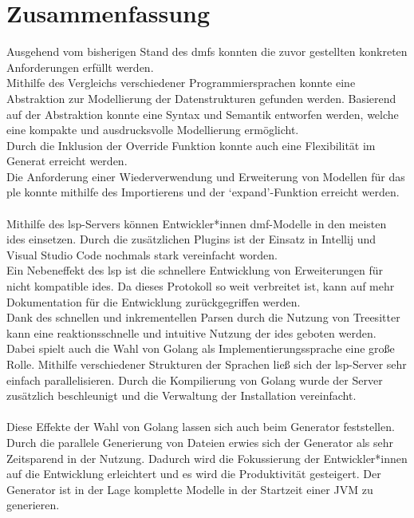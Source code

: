 \documentclass[./einleitung.tex]{subfiles}
\begin{document}
\section{Zusammenfassung}\label{sec:zusammenfassung}
Ausgehend vom bisherigen Stand des \acrshort{dmf}s konnten die zuvor gestellten konkreten Anforderungen erfüllt werden.\\
Mithilfe des Vergleichs verschiedener Programmiersprachen konnte eine Abstraktion zur Modellierung der Datenstrukturen gefunden werden.
Basierend auf der Abstraktion konnte eine Syntax und Semantik entworfen werden, welche eine kompakte und ausdrucksvolle Modellierung ermöglicht.\\
Durch die Inklusion der Override Funktion konnte auch eine Flexibilität im Generat erreicht werden.\\
Die Anforderung einer Wiederverwendung und Erweiterung von Modellen für das \acrshort{ple} konnte mithilfe des Importierens und der `expand'-Funktion erreicht werden.
\\\\
Mithilfe des \acrshort{lsp}-Servers können Entwickler*innen \acrshort{dmf}-Modelle in den meisten \acrshort{ide}s einsetzen.
Durch die zusätzlichen Plugins ist der Einsatz in Intellij und Visual Studio Code nochmals stark vereinfacht worden.\\
Ein Nebeneffekt des \acrshort{lsp} ist die schnellere Entwicklung von Erweiterungen für nicht kompatible \acrshort{ide}s.
Da dieses Protokoll so weit verbreitet ist, kann auf mehr Dokumentation für die Entwicklung zurückgegriffen werden.\\
Dank des schnellen und inkrementellen Parsen durch die Nutzung von Treesitter kann eine reaktionsschnelle und intuitive Nutzung der \acrshort{ide}s geboten werden.
Dabei spielt auch die Wahl von Golang als Implementierungssprache eine große Rolle.
Mithilfe verschiedener Strukturen der Sprachen ließ sich der \acrshort{lsp}-Server sehr einfach parallelisieren.
Durch die Kompilierung von Golang wurde der Server zusätzlich beschleunigt und die Verwaltung der Installation vereinfacht.
\\\\
Diese Effekte der Wahl von Golang lassen sich auch beim Generator feststellen.
Durch die parallele Generierung von Dateien erwies sich der Generator als sehr Zeitsparend in der Nutzung.
Dadurch wird die Fokussierung der Entwickler*innen auf die Entwicklung erleichtert und es wird die Produktivität gesteigert.
Der Generator ist in der Lage komplette Modelle in der Startzeit einer JVM zu generieren.\\
\end{document}

